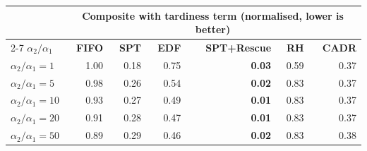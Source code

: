 \begin{tabular}{lrrrrrr}
\toprule
& \multicolumn{6}{c}{\textbf{Composite with tardiness term (normalised, lower is better)}} \\
\cmidrule(lr){2-7}
\textbf{$\alpha_2/\alpha_1$} & \textbf{FIFO} & \textbf{SPT} & \textbf{EDF} & \textbf{SPT+Rescue} & \textbf{RH} & \textbf{CADR} \\
\midrule
$\alpha_2/\alpha_1=1$ & 1.00 & 0.18 & 0.75 & \textbf{0.03} & 0.59 & 0.37 \\
$\alpha_2/\alpha_1=5$ & 0.98 & 0.26 & 0.54 & \textbf{0.02} & 0.83 & 0.37 \\
$\alpha_2/\alpha_1=10$ & 0.93 & 0.27 & 0.49 & \textbf{0.01} & 0.83 & 0.37 \\
$\alpha_2/\alpha_1=20$ & 0.91 & 0.28 & 0.47 & \textbf{0.01} & 0.83 & 0.37 \\
$\alpha_2/\alpha_1=50$ & 0.89 & 0.29 & 0.46 & \textbf{0.02} & 0.83 & 0.38 \\
\bottomrule
\end{tabular}
